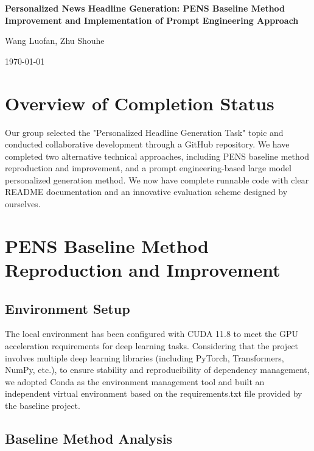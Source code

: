 \documentclass[10pt,a4paper]{article}
\begin{document}
\begin{center}
    \LARGE{\textbf{Personalized News Headline Generation: PENS Baseline Method Improvement and Implementation of Prompt Engineering Approach}}
    
    \vspace{0.5cm}
    \large{Wang Luofan, Zhu Shouhe}
    
    \vspace{0.3cm}
    \today
\end{center}

\section{Overview of Completion Status}
Our group selected the "Personalized Headline Generation Task" topic and conducted collaborative development through a GitHub repository. We have completed two alternative technical approaches, including PENS baseline method reproduction and improvement, and a prompt engineering-based large model personalized generation method. We now have complete runnable code with clear README documentation and an innovative evaluation scheme designed by ourselves.

\section{PENS Baseline Method Reproduction and Improvement}
\subsection{Environment Setup}
The local environment has been configured with CUDA 11.8 to meet the GPU acceleration requirements for deep learning tasks. Considering that the project involves multiple deep learning libraries (including PyTorch, Transformers, NumPy, etc.), to ensure stability and reproducibility of dependency management, we adopted Conda as the environment management tool and built an independent virtual environment based on the requirements.txt file provided by the baseline project.

\subsection{Baseline Method Analysis}
\end{document}
